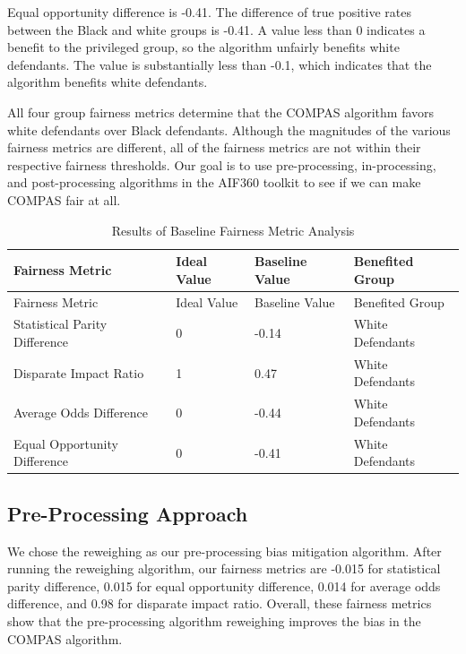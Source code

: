 \documentclass[water,article,submit,moreauthors,pdftex]{mdpi}
\begin{document}
Equal opportunity difference is -0.41. The difference of true positive
rates between the Black and white groups is -0.41. A value less than 0
indicates a benefit to the privileged group, so the algorithm unfairly
benefits white defendants. The value is substantially less than -0.1,
which indicates that the algorithm benefits white defendants.

All four group fairness metrics determine that the COMPAS algorithm
favors white defendants over Black defendants. Although the magnitudes
of the various fairness metrics are different, all of the fairness
metrics are not within their respective fairness thresholds. Our goal is
to use pre-processing, in-processing, and post-processing algorithms in
the AIF360 toolkit to see if we can make COMPAS fair at all.

\begin{longtable}[]{@{}llll@{}}
\caption{Results of Baseline Fairness Metric Analysis
\label{tab:baseline metrics table}}\tabularnewline
\toprule
Fairness Metric & Ideal Value & Baseline Value & Benefited Group \\
\midrule
\endfirsthead
\toprule
Fairness Metric & Ideal Value & Baseline Value & Benefited Group \\
\midrule
\endhead
Statistical Parity Difference & 0 & -0.14 & White Defendants \\
Disparate Impact Ratio & 1 & 0.47 & White Defendants \\
Average Odds Difference & 0 & -0.44 & White Defendants \\
Equal Opportunity Difference & 0 & -0.41 & White Defendants \\
\bottomrule
\end{longtable}

\hypertarget{pre-processing-approach}{%
\subsection{Pre-Processing Approach}\label{pre-processing-approach}}

We chose the reweighing as our pre-processing bias mitigation algorithm.
After running the reweighing algorithm, our fairness metrics are -0.015
for statistical parity difference, 0.015 for equal opportunity
difference, 0.014 for average odds difference, and 0.98 for disparate
impact ratio. Overall, these fairness metrics show that the
pre-processing algorithm reweighing improves the bias in the COMPAS
algorithm.

%
\end{document}
